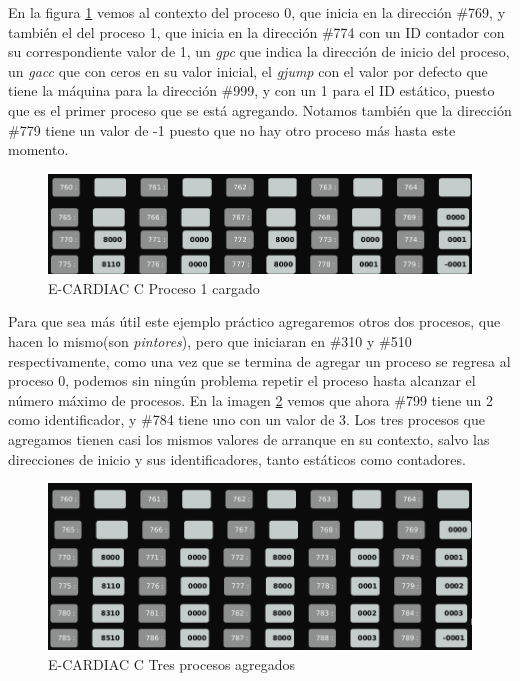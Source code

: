 \documentclass[letterpaper,12pt,oneside]{book}
\begin{document}
        En la figura \ref{fig:eccZPProceso1}
		vemos al contexto del proceso 0, que inicia en la dirección \#769, y también el del proceso 1, que inicia en la dirección \#774 con un ID contador
		con su correspondiente valor de 1, un \textit{gpc} que indica la dirección de inicio del proceso, un \textit{gacc} que con ceros en su valor inicial,
		el \textit{gjump} con el valor por defecto que tiene la máquina para la dirección \#999, y con un 1 para el ID estático, puesto que es el primer 
		proceso que se está agregando. Notamos también que la dirección \#779 tiene un valor de -1 puesto que no hay otro proceso más hasta este momento.
		
		\begin{figure}[h]		
			\centering
			\includegraphics[scale=0.45]{media/CARDIACC/eccZonaProcesosPrograma1.png}
			\caption{E-CARDIAC C Proceso 1 cargado}
			\label{fig:eccZPProceso1}
		\end{figure}	
		

		Para que sea más útil este ejemplo práctico agregaremos otros dos procesos, que hacen lo mismo(son \textit{pintores}), pero que iniciaran en \#310 y \#510 
		respectivamente, como una vez que se termina de agregar un proceso se regresa al proceso 0, podemos sin ningún problema repetir el proceso
		hasta alcanzar el número máximo de procesos. En la imagen \ref{fig:eccTresProcessoAgregados} vemos que ahora \#799 tiene un 2 como identificador, y \#784 tiene
		uno con un valor de 3. Los tres procesos que agregamos tienen casi los mismos valores de arranque en su contexto, salvo las direcciones de inicio
		y sus identificadores, tanto estáticos como contadores.
		
		
		\begin{figure}[h]		
			\centering
			\includegraphics[scale=0.45]{media/CARDIACC/eccZP3procesosadded.png}
			\caption{E-CARDIAC C Tres procesos agregados }
			\label{fig:eccTresProcessoAgregados}
		\end{figure}					
		
\end{document}
